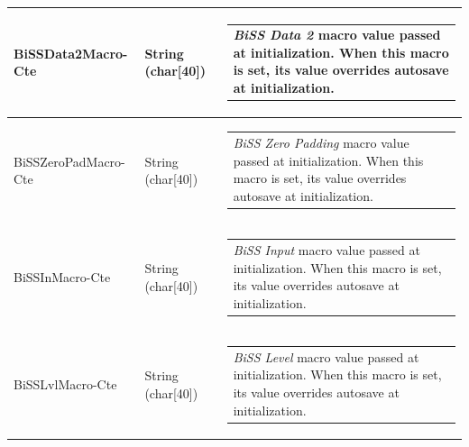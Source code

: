 \documentclass[openany]{article}
\begin{document}
\begin{longtable}{| m{4.5cm} m{2.5cm}  m{8.5cm} |}
        BiSSData2Macro-Cte & String (char[40]) & \begin{tabular}{@{}m{6cm}@{}}
                \emph{BiSS Data 2} macro value passed at initialization. When this macro is set, its value overrides autosave at initialization.
            \end{tabular} \hypertarget{pv:biss-zero-pad-macro-cte}{}\\ \hline
        BiSSZeroPadMacro-Cte & String (char[40]) & \begin{tabular}{@{}m{6cm}@{}}
                \emph{BiSS Zero Padding} macro value passed at initialization. When this macro is set, its value overrides autosave at initialization.
            \end{tabular} \hypertarget{pv:biss-in-macro-cte}{}\\ \hline
        BiSSInMacro-Cte & String (char[40]) & \begin{tabular}{@{}m{6cm}@{}}
                \emph{BiSS Input} macro value passed at initialization. When this macro is set, its value overrides autosave at initialization.
            \end{tabular} \hypertarget{pv:biss-lvl-macro-cte}{}\\ \hline
        BiSSLvlMacro-Cte & String (char[40]) & \begin{tabular}{@{}m{6cm}@{}}
                \emph{BiSS Level} macro value passed at initialization. When this macro is set, its value overrides autosave at initialization\cite{mtrrec}.
            \end{tabular} \hypertarget{}{}\\ \hline
    \end{longtable}
\end{document}
